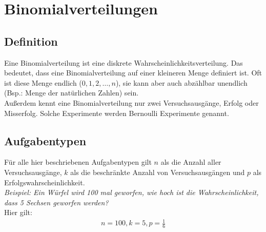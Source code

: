 \chapter{Binomialverteilungen}

\section{Definition}
\begin{flushleft}
    Eine Binomialverteilung ist eine diskrete Wahrscheinlichkeitsverteilung. Das bedeutet, dass eine Binomialverteilung
    auf einer kleineren Menge definiert ist. Oft ist diese Menge endlich (${0,1,2,\dots,n}$), sie kann aber auch abzählbar
    unendlich (Bsp.: Menge der natürlichen Zahlen) sein. \\
    Außerdem kennt eine Binomialverteilung nur zwei Versuchsausgänge, Erfolg oder Misserfolg. Solche Experimente werden Bernoulli
    Experimente genannt.
\end{flushleft}

\section{Aufgabentypen}
\begin{flushleft}
    Für alle hier beschriebenen Aufgabentypen gilt $n$ als die Anzahl aller Versuchsausgänge, $k$ als die beschränkte Anzahl von
    Versuchsausgängen und $p$ als Erfolgswahrscheinlichkeit. \\
    \textit{Beispiel: Ein Würfel wird 100 mal geworfen, wie hoch ist die Wahrscheinlichkeit, dass 5 Sechsen geworfen werden?} \\
    Hier gilt:
    \begin{align}
        n=100,k=5,p=\frac{1}{6}
    \end{align}
\end{flushleft}

